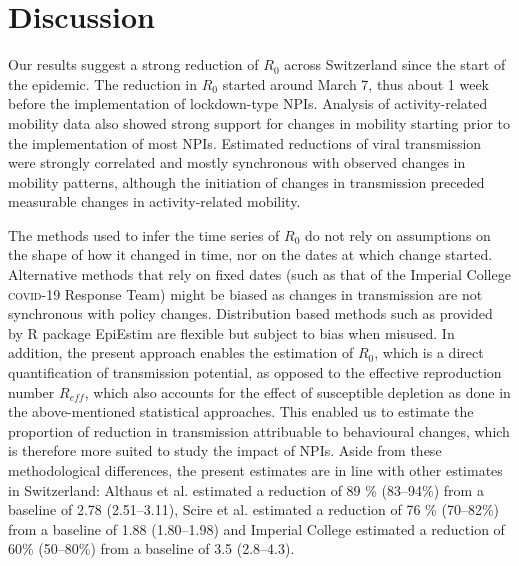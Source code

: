 \section{Discussion}
Our results suggest a strong reduction of $R_0$ across Switzerland since the start of the epidemic. The reduction in $R_0$ started around March 7, thus about 1 week before the implementation of lockdown-type NPIs. Analysis of activity-related mobility data also showed strong support for changes in mobility starting prior to the implementation of most NPIs. Estimated reductions of viral transmission were strongly correlated and mostly synchronous with observed changes in mobility patterns, although the initiation of changes in transmission preceded measurable changes in activity-related mobility. 

The methods used to infer the time series of $R_0$ do not rely on assumptions on the shape of how it changed in time, nor on the dates at which change started. Alternative methods that rely on fixed dates (such as that of the Imperial College \textsc{covid}-19 Response Team\cite{Flaxman:Report13Estimating:2020}) might be biased as changes in transmission are not synchronous with policy changes. Distribution based methods such as provided by R package EpiEstim\cite{Wallinga:DifferentEpidemicCurves:2004,Cori:NewFrameworkSoftware:2013} are flexible but subject to bias when misused\cite{Lipsitch:CommentPanLiu:2020}. In addition, the present approach enables the estimation of $R_0$, which is a direct quantification of transmission potential, as opposed to the effective reproduction number $R_{eff}$, which also accounts for the effect of susceptible depletion as done in the above-mentioned statistical approaches. This enabled us to estimate the proportion of reduction in transmission attribuable to behavioural changes, which is therefore more suited to study the impact of NPIs. Aside from these methodological differences, the present estimates are in line with other estimates in Switzerland: Althaus et al.\cite{Althaus:RealtimeModelingProjections:2020} estimated a reduction of 89 \% (83–94\%) from a baseline of 2.78 (2.51–3.11), Scire et al.\cite{Scire:ReproductiveNumberCOVID19:2020} estimated a reduction of 76 \% (70–82\%) from a baseline of 1.88 (1.80–1.98) and Imperial College estimated a reduction of 60\% (50–80\%) from a baseline of 3.5 (2.8–4.3)\cite{Flaxman:Report13Estimating:2020}. 

